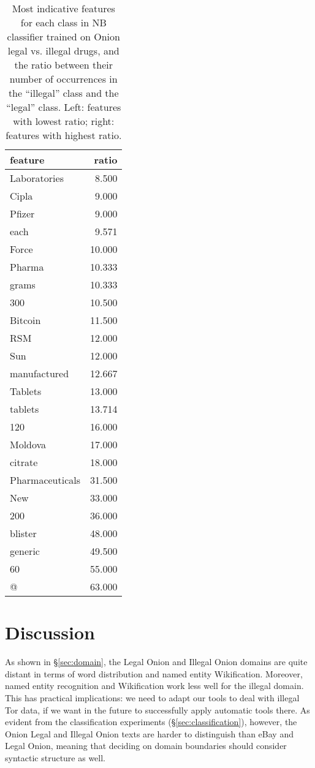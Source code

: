 \documentclass[11pt,a4paper,table]{article}
\begin{document}
\begin{table}[t]
\begin{tabular}{lr}
feature & ratio\\
\hline
Laboratories & 8.500\\
Cipla & 9.000\\
Pfizer & 9.000\\
each & 9.571\\
Force & 10.000\\
Pharma & 10.333\\
grams & 10.333\\
300 & 10.500\\
Bitcoin & 11.500\\
RSM & 12.000\\
Sun & 12.000\\
manufactured & 12.667\\
Tablets & 13.000\\
tablets & 13.714\\
120 & 16.000\\
Moldova & 17.000\\
citrate & 18.000\\
Pharmaceuticals & 31.500\\
New & 33.000\\
200 & 36.000\\
blister & 48.000\\
generic & 49.500\\
60 & 55.000\\
@ & 63.000\\
\end{tabular}
\caption{Most indicative features for each class in NB classifier
trained on Onion legal vs. illegal drugs,
and the ratio between their number of occurrences in the ``illegal''
class and the ``legal'' class.
Left: features with lowest ratio; right: features with highest ratio.
\label{tab:nb_weights}}
\end{table}


\section{Discussion} \label{sec:discussion}

  As shown in \S\ref{sec:domain}, the Legal Onion and Illegal Onion domains
  are quite distant in terms of word distribution and named entity Wikification.
  Moreover, named entity recognition and Wikification work less well
  for the illegal domain.
  This has practical implications: we need to adapt our tools to deal with illegal Tor data, if we want in the future to successfully apply automatic tools there.
  As evident from the classification experiments (\S\ref{sec:classification}), however,
  the Onion Legal and Illegal Onion texts are harder to distinguish than
  eBay and Legal Onion, meaning that deciding on domain boundaries should consider syntactic structure as well.
\end{document}
